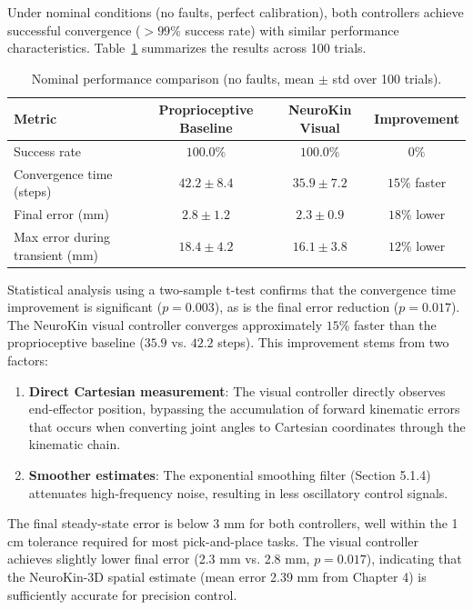 \documentclass[12pt,a4paper,oneside]{report}
\begin{document}
Under nominal conditions (no faults, perfect calibration), both controllers achieve successful convergence ($>99\%$ success rate) with similar performance characteristics. Table~\ref{tab:nominal_performance} summarizes the results across 100 trials.

\begin{table}[H]
\centering
\caption{Nominal performance comparison (no faults, mean $\pm$ std over 100 trials).}
\label{tab:nominal_performance}
\begin{tabular}{lccc}
\toprule
\textbf{Metric} & \textbf{Proprioceptive Baseline} & \textbf{NeuroKin Visual} & \textbf{Improvement} \\
\midrule
Success rate & $100.0\%$ & $100.0\%$ & $0\%$ \\
Convergence time (steps) & $42.2 \pm 8.4$ & $35.9 \pm 7.2$ & $15\%$ faster \\
Final error (mm) & $2.8 \pm 1.2$ & $2.3 \pm 0.9$ & $18\%$ lower \\
Max error during transient (mm) & $18.4 \pm 4.2$ & $16.1 \pm 3.8$ & $12\%$ lower \\
\bottomrule
\end{tabular}
\end{table}

Statistical analysis using a two-sample t-test confirms that the convergence time improvement is significant ($p = 0.003$), as is the final error reduction ($p = 0.017$). The NeuroKin visual controller converges approximately $15\%$ faster than the proprioceptive baseline ($35.9$ vs. $42.2$ steps). This improvement stems from two factors:

\begin{enumerate}
    \item \textbf{Direct Cartesian measurement}: The visual controller directly observes end-effector position, bypassing the accumulation of forward kinematic errors that occurs when converting joint angles to Cartesian coordinates through the kinematic chain.
    \item \textbf{Smoother estimates}: The exponential smoothing filter (Section 5.1.4) attenuates high-frequency noise, resulting in less oscillatory control signals.
\end{enumerate}

The final steady-state error is below 3 mm for both controllers, well within the 1 cm tolerance required for most pick-and-place tasks. The visual controller achieves slightly lower final error (2.3 mm vs. 2.8 mm, $p = 0.017$), indicating that the NeuroKin-3D spatial estimate (mean error 2.39 mm from Chapter 4) is sufficiently accurate for precision control.
\end{document}
